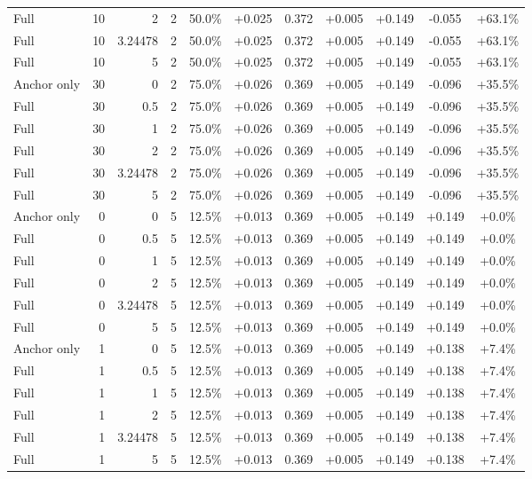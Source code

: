 \begin{table}[htbp]
\begin{tabular}{lrrrccccccc}
Full & 10 & 2 & 2 & 50.0\% & +0.025 & 0.372 & +0.005 & +0.149 & -0.055 & +63.1\% \\
Full & 10 & 3.24478 & 2 & 50.0\% & +0.025 & 0.372 & +0.005 & +0.149 & -0.055 & +63.1\% \\
Full & 10 & 5 & 2 & 50.0\% & +0.025 & 0.372 & +0.005 & +0.149 & -0.055 & +63.1\% \\
Anchor only & 30 & 0 & 2 & 75.0\% & +0.026 & 0.369 & +0.005 & +0.149 & -0.096 & +35.5\% \\
Full & 30 & 0.5 & 2 & 75.0\% & +0.026 & 0.369 & +0.005 & +0.149 & -0.096 & +35.5\% \\
Full & 30 & 1 & 2 & 75.0\% & +0.026 & 0.369 & +0.005 & +0.149 & -0.096 & +35.5\% \\
Full & 30 & 2 & 2 & 75.0\% & +0.026 & 0.369 & +0.005 & +0.149 & -0.096 & +35.5\% \\
Full & 30 & 3.24478 & 2 & 75.0\% & +0.026 & 0.369 & +0.005 & +0.149 & -0.096 & +35.5\% \\
Full & 30 & 5 & 2 & 75.0\% & +0.026 & 0.369 & +0.005 & +0.149 & -0.096 & +35.5\% \\
Anchor only & 0 & 0 & 5 & 12.5\% & +0.013 & 0.369 & +0.005 & +0.149 & +0.149 & +0.0\% \\
Full & 0 & 0.5 & 5 & 12.5\% & +0.013 & 0.369 & +0.005 & +0.149 & +0.149 & +0.0\% \\
Full & 0 & 1 & 5 & 12.5\% & +0.013 & 0.369 & +0.005 & +0.149 & +0.149 & +0.0\% \\
Full & 0 & 2 & 5 & 12.5\% & +0.013 & 0.369 & +0.005 & +0.149 & +0.149 & +0.0\% \\
Full & 0 & 3.24478 & 5 & 12.5\% & +0.013 & 0.369 & +0.005 & +0.149 & +0.149 & +0.0\% \\
Full & 0 & 5 & 5 & 12.5\% & +0.013 & 0.369 & +0.005 & +0.149 & +0.149 & +0.0\% \\
Anchor only & 1 & 0 & 5 & 12.5\% & +0.013 & 0.369 & +0.005 & +0.149 & +0.138 & +7.4\% \\
Full & 1 & 0.5 & 5 & 12.5\% & +0.013 & 0.369 & +0.005 & +0.149 & +0.138 & +7.4\% \\
Full & 1 & 1 & 5 & 12.5\% & +0.013 & 0.369 & +0.005 & +0.149 & +0.138 & +7.4\% \\
Full & 1 & 2 & 5 & 12.5\% & +0.013 & 0.369 & +0.005 & +0.149 & +0.138 & +7.4\% \\
Full & 1 & 3.24478 & 5 & 12.5\% & +0.013 & 0.369 & +0.005 & +0.149 & +0.138 & +7.4\% \\
Full & 1 & 5 & 5 & 12.5\% & +0.013 & 0.369 & +0.005 & +0.149 & +0.138 & +7.4\% \\

\end{tabular}
\end{table}
